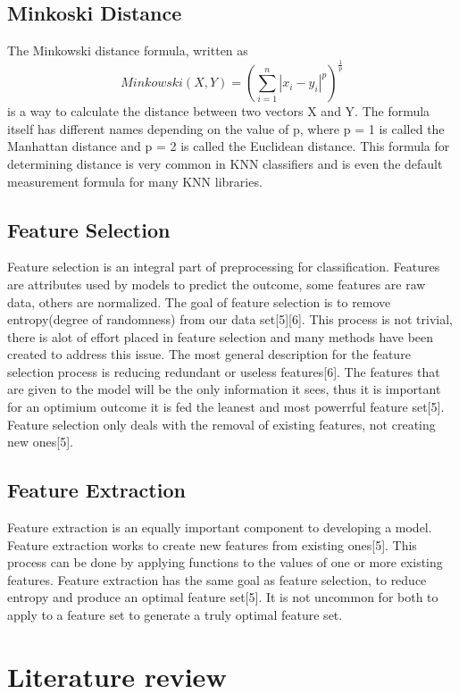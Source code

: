 \documentclass[confrence]{IEEEtran}
\begin{document}
\subsection*{Minkoski Distance}
The Minkowski distance formula, written as \[ Minkowski(X,Y) = (\sum_{i=1}^n|x_i-y_i|^p)^\frac{1}{p}\] is a way to calculate the distance between two vectors X and Y.
The formula itself has different names depending on the value of p, where p = 1 is called the Manhattan distance and p = 2 is called the Euclidean distance.
This formula for determining distance is very common in KNN classifiers and is even the default measurement formula for many KNN libraries.
\subsection*{Feature Selection}
Feature selection is an integral part of preprocessing for classification.
Features are attributes used by models to predict the outcome, some features are raw data, others are normalized.
The goal of feature selection is to remove entropy(degree of randomness) from our data set[5][6].
This process is not trivial, there is alot of effort placed in feature selection and many methods have been created to address this issue.
The most general description for the feature selection process is reducing redundant or useless features[6].
The features that are given to the model will be the only information it sees, thus it is important for an optimium outcome it is fed the leanest and most powerrful feature set[5].
Feature selection only deals with the removal of existing features, not creating new ones[5].
\subsection*{Feature Extraction}
Feature extraction is an equally important component to developing a model.
Feature extraction works to create new features from existing ones[5].
This process can be done by applying functions to the values of one or more existing features.
Feature extraction has the same goal as feature selection, to reduce entropy and produce an optimal feature set[5].
It is not uncommon for both to apply to a feature set to generate a truly optimal feature set.
\section*{Literature review}
\end{document}
